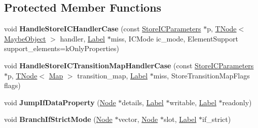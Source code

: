 \subsection*{Protected Member Functions}
\begin{DoxyCompactItemize}
\item 
\mbox{\label{classv8_1_1internal_1_1AccessorAssembler_a6943af3ec771ef419897e88e2a9854e5}} 
void {\bfseries Handle\+Store\+I\+C\+Handler\+Case} (const \mbox{\hyperlink{structv8_1_1internal_1_1AccessorAssembler_1_1StoreICParameters}{Store\+I\+C\+Parameters}} $\ast$p, \mbox{\hyperlink{classv8_1_1internal_1_1compiler_1_1TNode}{T\+Node}}$<$ \mbox{\hyperlink{classv8_1_1internal_1_1MaybeObject}{Maybe\+Object}} $>$ handler, \mbox{\hyperlink{classv8_1_1internal_1_1compiler_1_1CodeAssemblerLabel}{Label}} $\ast$miss, I\+C\+Mode ic\+\_\+mode, Element\+Support support\+\_\+elements=k\+Only\+Properties)
\item 
\mbox{\label{classv8_1_1internal_1_1AccessorAssembler_a4b8655f3c396b72381847f3a120f0c0f}} 
void {\bfseries Handle\+Store\+I\+C\+Transition\+Map\+Handler\+Case} (const \mbox{\hyperlink{structv8_1_1internal_1_1AccessorAssembler_1_1StoreICParameters}{Store\+I\+C\+Parameters}} $\ast$p, \mbox{\hyperlink{classv8_1_1internal_1_1compiler_1_1TNode}{T\+Node}}$<$ \mbox{\hyperlink{classv8_1_1internal_1_1Map}{Map}} $>$ transition\+\_\+map, \mbox{\hyperlink{classv8_1_1internal_1_1compiler_1_1CodeAssemblerLabel}{Label}} $\ast$miss, Store\+Transition\+Map\+Flags flags)
\item 
\mbox{\label{classv8_1_1internal_1_1AccessorAssembler_a543857db01e790acf2d7a134d7302565}} 
void {\bfseries Jump\+If\+Data\+Property} (\mbox{\hyperlink{classv8_1_1internal_1_1compiler_1_1Node}{Node}} $\ast$details, \mbox{\hyperlink{classv8_1_1internal_1_1compiler_1_1CodeAssemblerLabel}{Label}} $\ast$writable, \mbox{\hyperlink{classv8_1_1internal_1_1compiler_1_1CodeAssemblerLabel}{Label}} $\ast$readonly)
\item 
\mbox{\label{classv8_1_1internal_1_1AccessorAssembler_a63c8a898b155643eb1ea765dc539dffb}} 
void {\bfseries Branch\+If\+Strict\+Mode} (\mbox{\hyperlink{classv8_1_1internal_1_1compiler_1_1Node}{Node}} $\ast$vector, \mbox{\hyperlink{classv8_1_1internal_1_1compiler_1_1Node}{Node}} $\ast$slot, \mbox{\hyperlink{classv8_1_1internal_1_1compiler_1_1CodeAssemblerLabel}{Label}} $\ast$if\+\_\+strict)

\end{DoxyCompactItemize}
